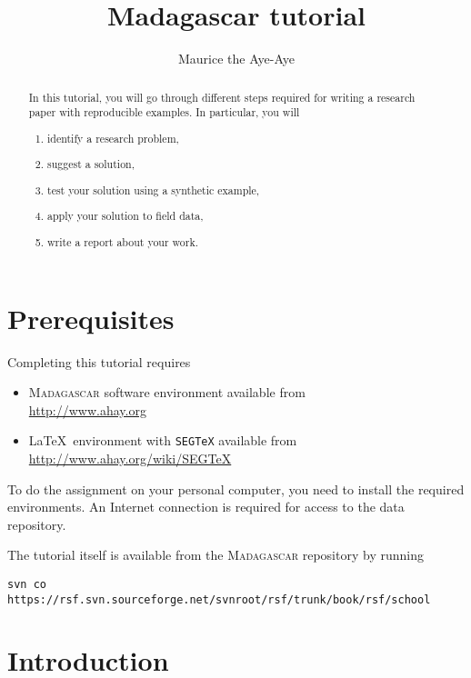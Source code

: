 \author{Maurice the Aye-Aye}
\title{Madagascar tutorial}


\maketitle

\begin{abstract}
  In this tutorial, you will go through different steps required for writing a research paper with reproducible examples. In particular, you will
  \begin{enumerate}
    \item identify a research problem,
    \item suggest a solution,
    \item test your solution using a synthetic example,
    \item apply your solution to field data,
    \item write  a report about your work.
  \end{enumerate}
\end{abstract}

\section{Prerequisites}

Completing this tutorial requires
\begin{itemize}
\item \textsc{Madagascar} software environment available from \\
\url{http://www.ahay.org}
\item \LaTeX\ environment with \texttt{SEGTeX} available from \\ 
\url{http://www.ahay.org/wiki/SEGTeX}
\end{itemize}
To do the assignment on your personal computer, you need to install
the required environments. An Internet connection is required for
access to the data repository.

The tutorial itself is available from the \textsc{Madagascar} repository
by running
\begin{verbatim}
svn co https://rsf.svn.sourceforge.net/svnroot/rsf/trunk/book/rsf/school
\end{verbatim}

\section{Introduction}

